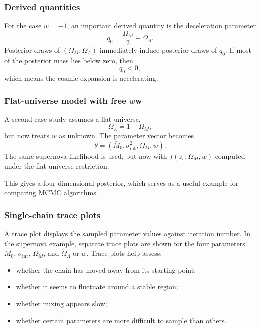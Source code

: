 \documentclass[11pt, titlepage]{article} %
\numberwithin{equation}{section}
\theoremstyle{definition}
\numberwithin{assumption}{section}
\begin{document}
\subsubsection*{Derived quantities}

For the case $w=-1$, an important derived quantity is the deceleration parameter
\begin{equation*}
    q_0=\frac{\Omega_M}{2}-\Omega_\Lambda.
\end{equation*}
Posterior draws of $(\Omega_M,\Omega_\Lambda)$ immediately induce posterior draws of $q_0$. If most of the posterior mass lies below zero, then
\begin{equation*}
    q_0<0,
\end{equation*}
which means the cosmic expansion is accelerating.

\subsubsection*{Flat-universe model with free {$w$}{w}}

A second case study assumes a flat universe,
\begin{equation*}
    \Omega_\Lambda=1-\Omega_M,
\end{equation*}
but now treats $w$ as unknown. The parameter vector becomes
\begin{equation*}
    \theta=(\bar M_0,\sigma_{\mathrm{int}}^2,\Omega_M,w).
\end{equation*}
The same supernova likelihood is used, but now with
$f(z_s;\Omega_M,w)$ computed under the flat-universe restriction.

This gives a four-dimensional posterior, which serves as a useful example for comparing MCMC algorithms.

\subsubsection*{Single-chain trace plots}

A trace plot displays the sampled parameter values against iteration number. In the supernova example, separate trace plots are shown for the four parameters
$\bar M_0$, $\sigma_{\mathrm{int}}$, $\Omega_M$, and $\Omega_\Lambda$ or $w$.
Trace plots help assess:
\begin{itemize}
    \item whether the chain has moved away from its starting point;
    \item whether it seems to fluctuate around a stable region;
    \item whether mixing appears slow;
    \item whether certain parameters are more difficult to sample than others.
\end{itemize}
\end{document}
